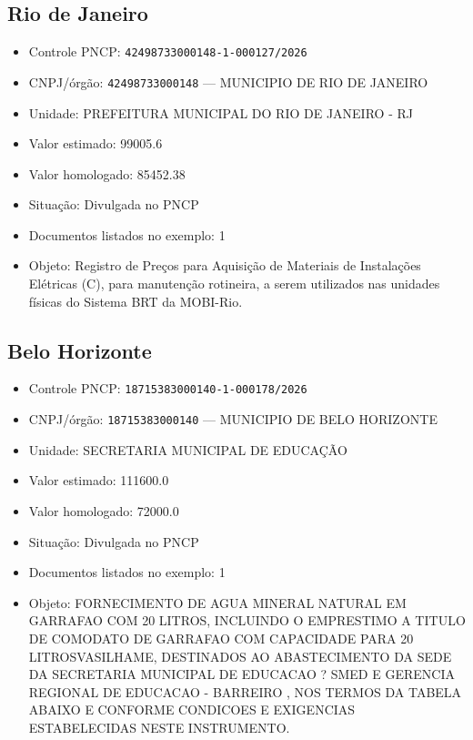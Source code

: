 \documentclass[12pt]{article}
\providecommand{\tightlist}{%
  \setlength{\itemsep}{0pt}\setlength{\parskip}{0pt}}
\begin{document}
\subsection{Rio de Janeiro}\label{rio-de-janeiro}

\begin{itemize}
\tightlist
\item
  Controle PNCP: \texttt{42498733000148-1-000127/2026}
\item
  CNPJ/órgão: \texttt{42498733000148} --- MUNICIPIO DE RIO DE JANEIRO
\item
  Unidade: PREFEITURA MUNICIPAL DO RIO DE JANEIRO - RJ
\item
  Valor estimado: 99005.6
\item
  Valor homologado: 85452.38
\item
  Situação: Divulgada no PNCP
\item
  Documentos listados no exemplo: 1
\item
  Objeto: Registro de Preços para Aquisição de Materiais de Instalações
  Elétricas (C), para manutenção rotineira, a serem utilizados nas
  unidades físicas do Sistema BRT da MOBI-Rio.
\end{itemize}

\subsection{Belo Horizonte}\label{belo-horizonte}

\begin{itemize}
\tightlist
\item
  Controle PNCP: \texttt{18715383000140-1-000178/2026}
\item
  CNPJ/órgão: \texttt{18715383000140} --- MUNICIPIO DE BELO HORIZONTE
\item
  Unidade: SECRETARIA MUNICIPAL DE EDUCAÇÃO
\item
  Valor estimado: 111600.0
\item
  Valor homologado: 72000.0
\item
  Situação: Divulgada no PNCP
\item
  Documentos listados no exemplo: 1
\item
  Objeto: FORNECIMENTO DE AGUA MINERAL NATURAL EM GARRAFAO COM 20
  LITROS, INCLUINDO O EMPRESTIMO A TITULO DE COMODATO DE GARRAFAO COM
  CAPACIDADE PARA 20 LITROSVASILHAME, DESTINADOS AO ABASTECIMENTO DA
  SEDE DA SECRETARIA MUNICIPAL DE EDUCACAO ? SMED E GERENCIA REGIONAL DE
  EDUCACAO - BARREIRO , NOS TERMOS DA TABELA ABAIXO E CONFORME CONDICOES
  E EXIGENCIAS ESTABELECIDAS NESTE INSTRUMENTO.
\end{itemize}
\end{document}
